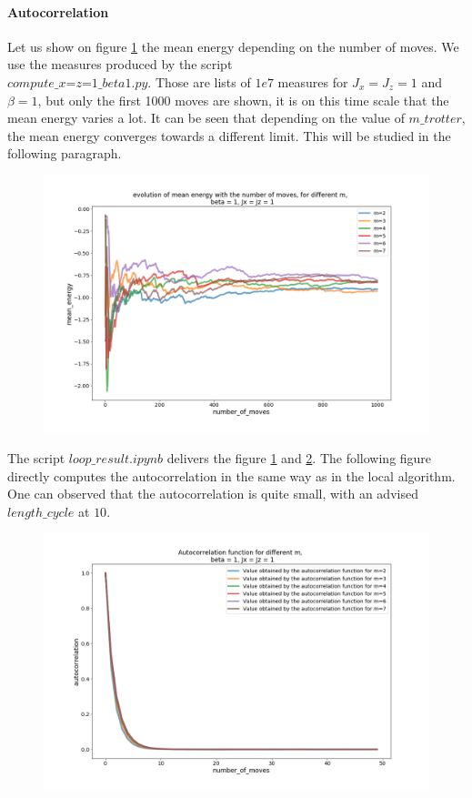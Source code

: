 \documentclass[a4paper,12pt]{article}
\begin{document}
	\paragraph{Autocorrelation}
	Let us show on figure \ref{meanenergylooplarger} the mean energy depending on the number of moves. We use the measures produced by the script \\ $compute\_x$=$z$=$1\_beta1.py$. Those are lists of $1e7$ measures for $J_x=J_z=1$ and $\beta=1$, but only the first 1000 moves are shown, it is on this time scale that the mean energy varies a lot. It can be seen that depending on the value of $m\_trotter$, the mean energy converges towards a different limit. This will be studied in the following paragraph. 
	\begin{figure}[H]
		\centering
		\includegraphics[width=12cm]{mean_energy_evolution_loop_x=z=1_m2-7.png}
		\caption{ }
		\label{meanenergylooplarger}
	\end{figure}
	The script $loop\_result.ipynb$ delivers the figure \ref{meanenergylooplarger} and \ref{autocorrloopxy}. The following figure directly computes the autocorrelation in the same way as in the local algorithm. One can observed that the autocorrelation is quite small, with an advised $length\_cycle$ at $10$.
	\begin{figure}[H]
		\centering
		\includegraphics[width=12cm]{autocorr_loop_x=y.png}
		\caption{ }
		\label{autocorrloopxy}
	\end{figure}
	
\end{document}
